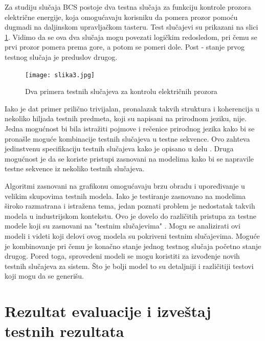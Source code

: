 \documentclass[a4paper]{article}
\begin{document}
\bigbreak

Za studiju slučaja BCS postoje dva testna slučaja za funkciju kontrole prozora električne energije, koja omogućavaju korisniku da pomera prozor pomoću dugmadi na daljinskom upravljačkom tasteru.  Test slučajevi su prikazani na slici \ref{fig:slika3}. Vidimo da se ova dva slučaja mogu povezati logičkim redosledom, pri čemu se prvi prozor pomera prema gore, a potom se pomeri dole. Post - stanje prvog testnog slučaja je preduslov drugog.
\bigbreak

\bigbreak
\begin{figure}[h!]
\begin{center}
\texttt{[image: slika3.jpg]}
\end{center}
\caption{Dva primera testnih slučajeva za kontrolu električnih prozora}
\label{fig:slika3}
\end{figure}
\bigbreak

Iako je dat primer prilično trivijalan, pronalazak takvih struktura i koherencija u nekoliko hiljada testnih predmeta, koji su napisani na prirodnom jeziku, nije. Jedna mogućnost bi bila istražiti pojmove i rečenice prirodnog jezika kako bi se pronašle moguće kombinacije testnih slučajeva u testne sekvence. Ovo zahteva jedinstvenu specifikaciju testnih slučajeva kako je opisano u delu \cite{ref23}. Druga mogućnost je da se koriste pristupi zasnovani na modelima \cite{ref23} kako bi se napravile testne sekvence iz nekoliko testnih slučajeva.
\bigbreak

Algoritmi zasnovani na grafikonu omogućavaju brzu obradu i upoređivanje u velikim skupovima testnih modela. Iako je testiranje zasnovano na modelima široko razmatrana i istražena tema, jedan poznati problem je nedostatak takvih modela u industrijskom kontekstu. Ovo je dovelo do različitih pristupa za testne modele koji su zasnovani na "testnim slučajevima" \cite{ref24}\cite{ref25}. Mogu se analizirati ovi modeli i videti koji delovi ovog modela su pokriveni testnim slučajevima.  Moguće je kombinovanje pri čemu je konačno stanje jednog testnog slučaja početno stanje drugog. Pored toga, sprovedeni modeli se mogu koristiti za izvođenje novih testnih slučajeva za sistem. Što je bolji model to su detaljniji i različitiji testovi koji mogu da se generišu.
\bigbreak

\section{Rezultat evaluacije i izveštaj testnih rezultata}
\label{sec:rezevaluacije}
\end{document}
